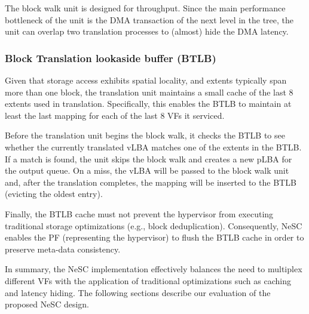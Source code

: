The block walk unit is designed for throughput. Since the main performance bottleneck of the unit is the DMA transaction of the next level in the tree, the unit can overlap two translation processes to (almost) hide the DMA latency.

\subsubsection*{Block Translation lookaside buffer (BTLB)}
Given that storage access exhibits spatial locality, and  extents typically span more than one block, the translation unit maintains a small cache of the last 8 extents used in translation. Specifically, this enables the BTLB to maintain at least the last mapping for each of the last 8 VFs it serviced.

Before the translation unit begins the block walk, it checks the BTLB to see whether the currently translated vLBA matches one of the extents in the BTLB. If a match is found, the unit skips the block walk and creates a new pLBA for the output queue.
On a miss, the vLBA will be passed to the block walk unit and, after the translation completes, the mapping will be inserted to the BTLB (evicting the oldest entry).

Finally, the BTLB cache must not prevent the hypervisor from executing traditional storage optimizations (e.g., block deduplication). Consequently, NeSC enables the PF (representing the hypervisor) to flush the BTLB cache in order to preserve meta-data consistency.


In summary, the NeSC implementation effectively balances the need to multiplex different VFs with the application of traditional optimizations such as caching and latency hiding. The following sections describe our evaluation of the proposed NeSC design.
